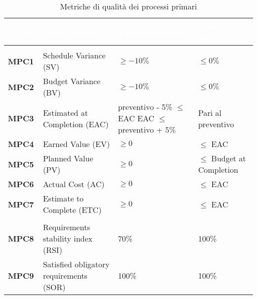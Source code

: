 {
\renewcommand{\arraystretch}{1.5}
\centering
\begin{longtable}{C{2.5cm} | C{4cm} | C{5cm} | C{3.5cm}}
\textcolor{white}{\textbf{Codice}}&
\textcolor{white}{\textbf{Nome metrica}}&
\textcolor{white}{\textbf{Valore accettabile}}&
\textcolor{white}{\textbf{Valore ottimale}}\\	

\endhead
\endfoot

\caption{Metriche di qualità dei processi primari}
\endlastfoot

 \\

\textbf{MPC1} & Schedule Variance (SV) & $\geq -10\%$ & $\leq 0\%$ \\
\textbf{MPC2} & Budget Variance (BV) & $\geq -10\%$ & $\leq 0\%$ \\
\textbf{MPC3} & Estimated at Completion (EAC) & preventivo - 5\% $ \leq $ EAC \newline EAC $ \leq $ preventivo + 5\% & Pari al preventivo  \\
\textbf{MPC4} & Earned Value (EV) & $\geq 0$  & $\leq $ EAC \\
\textbf{MPC5} & Planned Value (PV) & $\geq 0$  & $\leq $ Budget at Completion\\
\textbf{MPC6} & Actual Cost (AC) & $\geq 0$  & $\leq $ EAC\\
\textbf{MPC7} & Estimate to Complete (ETC) & $\geq 0$  & $\leq $ EAC\\

 \\

\textbf{MPC8} & Requirements stability index (RSI) & 70\% & 100\% \\
\textbf{MPC9} & Satisfied obligatory requirements (SOR) & 100\% & 100\%
\end{longtable}
}


